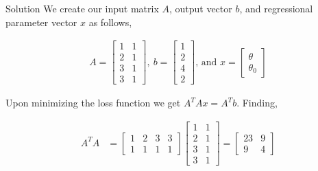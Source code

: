 \documentclass[pdf]{beamer}
\begin{document}
    \begin{frame}{Solution}
        We create our input matrix \(A\), output vector \(b\), and regressional parameter vector \(x\) as follows,

        \begin{align*}
            A=\begin{bmatrix}
                1&1\\
                2&1\\
                3&1\\
                3&1
            \end{bmatrix},\ b=\begin{bmatrix}
                1\\2\\4\\2
            \end{bmatrix}\text{, and }x=\begin{bmatrix}
                \theta\\\theta_0
            \end{bmatrix}
        \end{align*}

        Upon minimizing the loss function we get \(A^TAx=A^Tb\). Finding,

        \begin{align*}
            A^TA&=\begin{bmatrix}
                1&2&3&3\\
                1&1&1&1
            \end{bmatrix}\begin{bmatrix}
                1&1\\
                2&1\\
                3&1\\
                3&1
            \end{bmatrix}=\begin{bmatrix}
                23&9\\
                9&4
            \end{bmatrix}
        \end{align*}
    \end{frame}
\end{document}

